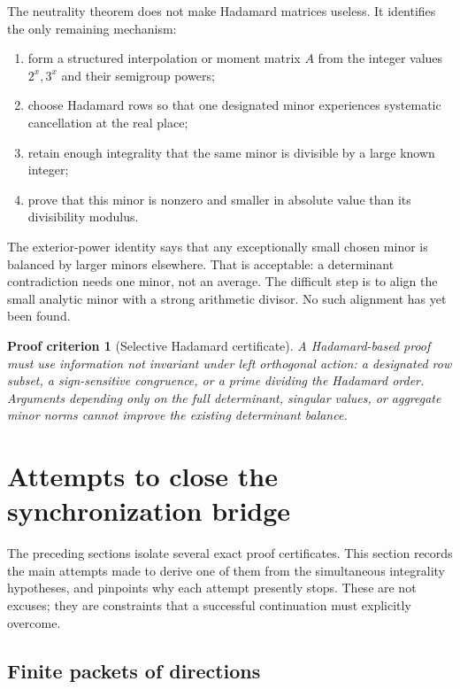 \documentclass[11pt,oneside]{article}
\newtheorem{criterion}[theorem]{Proof criterion}
\theoremstyle{definition}
\theoremstyle{remark}
\begin{document}
The neutrality theorem does not make Hadamard matrices useless.  It identifies the only
remaining mechanism:
\begin{enumerate}[label=\textup{(\roman*)}]
\item form a structured interpolation or moment matrix $A$ from the integer values
$2^x,3^x$ and their semigroup powers;
\item choose Hadamard rows so that one designated minor experiences systematic cancellation
at the real place;
\item retain enough integrality that the same minor is divisible by a large known integer;
\item prove that this minor is nonzero and smaller in absolute value than its divisibility
modulus.
\end{enumerate}
The exterior-power identity says that any exceptionally small chosen minor is balanced by
larger minors elsewhere.  That is acceptable: a determinant contradiction needs one minor,
not an average.  The difficult step is to align the small analytic minor with a strong
arithmetic divisor.  No such alignment has yet been found.

\begin{criterion}[Selective Hadamard certificate]
\label{crit:hadamard}
A Hadamard-based proof must use information not invariant under left orthogonal action:
a designated row subset, a sign-sensitive congruence, or a prime dividing the Hadamard
order.  Arguments depending only on the full determinant, singular values, or aggregate
minor norms cannot improve the existing determinant balance.
\end{criterion}

\section{Attempts to close the synchronization bridge}
\label{sec:attempts}

The preceding sections isolate several exact proof certificates.  This section records the
main attempts made to derive one of them from the simultaneous integrality hypotheses, and
pinpoints why each attempt presently stops.  These are not excuses; they are constraints that
a successful continuation must explicitly overcome.

\subsection{Finite packets of directions}
\end{document}
